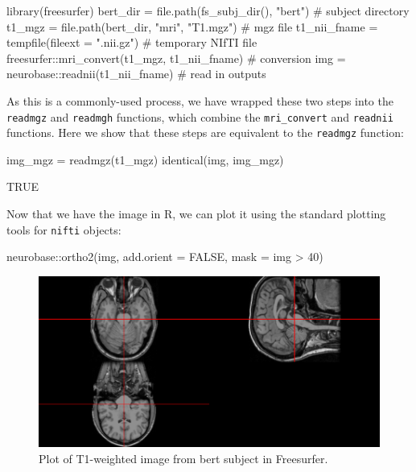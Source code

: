 \begin{Schunk}
\begin{Sinput}
library(freesurfer)
bert_dir = file.path(fs_subj_dir(), "bert") # subject directory
t1_mgz = file.path(bert_dir, "mri", "T1.mgz") # mgz file
t1_nii_fname = tempfile(fileext = ".nii.gz") # temporary NIfTI file
freesurfer::mri_convert(t1_mgz, t1_nii_fname) # conversion
img = neurobase::readnii(t1_nii_fname) # read in outputs
\end{Sinput}
\end{Schunk}

As this is a commonly-used process, we have wrapped these two steps into
the \texttt{readmgz} and \texttt{readmgh} functions, which combine the
\texttt{mri\_convert} and \texttt{readnii} functions. Here we show that
these steps are equivalent to the \texttt{readmgz} function:

\begin{Schunk}
\begin{Sinput}
img_mgz = readmgz(t1_mgz)
identical(img, img_mgz)
\end{Sinput}
\begin{Soutput}
[1] TRUE
\end{Soutput}
\end{Schunk}

Now that we have the image in R, we can plot it using the standard
plotting tools for \texttt{nifti} objects:

\begin{Schunk}
\begin{Sinput}
neurobase::ortho2(img, add.orient = FALSE, mask = img > 40)
\end{Sinput}
\begin{figure}
\includegraphics{Freesurfer_files/figure-latex/mri_plot-1} \caption[Plot of T1-weighted image from bert subject in Freesurfer]{Plot of T1-weighted image from bert subject in Freesurfer.}\label{fig:mri_plot}
\end{figure}
\end{Schunk}

